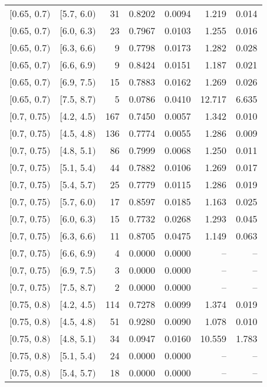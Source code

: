 \begin{longtable}{| l | l | r | r | r | r | r |}
        $[$0.65, 0.7$)$ & $[$5.7, 6.0$)$ & 31  & 0.8202 & 0.0094 & 1.219 & 0.014 \\
        $[$0.65, 0.7$)$ & $[$6.0, 6.3$)$ & 23  & 0.7967 & 0.0103 & 1.255 & 0.016 \\
        $[$0.65, 0.7$)$ & $[$6.3, 6.6$)$ & 9   & 0.7798 & 0.0173 & 1.282 & 0.028 \\
        $[$0.65, 0.7$)$ & $[$6.6, 6.9$)$ & 9   & 0.8424 & 0.0151 & 1.187 & 0.021 \\
        $[$0.65, 0.7$)$ & $[$6.9, 7.5$)$ & 15  & 0.7883 & 0.0162 & 1.269 & 0.026 \\
        $[$0.65, 0.7$)$ & $[$7.5, 8.7$)$ & 5   & 0.0786 & 0.0410 & 12.717 & 6.635 \\
        $[$0.7, 0.75$)$ & $[$4.2, 4.5$)$ & 167 & 0.7450 & 0.0057 & 1.342 & 0.010 \\
        $[$0.7, 0.75$)$ & $[$4.5, 4.8$)$ & 136 & 0.7774 & 0.0055 & 1.286 & 0.009 \\
        $[$0.7, 0.75$)$ & $[$4.8, 5.1$)$ & 86  & 0.7999 & 0.0068 & 1.250 & 0.011 \\
        $[$0.7, 0.75$)$ & $[$5.1, 5.4$)$ & 44  & 0.7882 & 0.0106 & 1.269 & 0.017 \\
        $[$0.7, 0.75$)$ & $[$5.4, 5.7$)$ & 25  & 0.7779 & 0.0115 & 1.286 & 0.019 \\
        $[$0.7, 0.75$)$ & $[$5.7, 6.0$)$ & 17  & 0.8597 & 0.0185 & 1.163 & 0.025 \\
        $[$0.7, 0.75$)$ & $[$6.0, 6.3$)$ & 15  & 0.7732 & 0.0268 & 1.293 & 0.045 \\
        $[$0.7, 0.75$)$ & $[$6.3, 6.6$)$ & 11  & 0.8705 & 0.0475 & 1.149 & 0.063 \\
        $[$0.7, 0.75$)$ & $[$6.6, 6.9$)$ & 4   & 0.0000 & 0.0000 & -- & -- \\
        $[$0.7, 0.75$)$ & $[$6.9, 7.5$)$ & 3   & 0.0000 & 0.0000 & -- & -- \\
        $[$0.7, 0.75$)$ & $[$7.5, 8.7$)$ & 2   & 0.0000 & 0.0000 & -- & -- \\
        $[$0.75, 0.8$)$ & $[$4.2, 4.5$)$ & 114 & 0.7278 & 0.0099 & 1.374 & 0.019 \\
        $[$0.75, 0.8$)$ & $[$4.5, 4.8$)$ & 51  & 0.9280 & 0.0090 & 1.078 & 0.010 \\
        $[$0.75, 0.8$)$ & $[$4.8, 5.1$)$ & 34  & 0.0947 & 0.0160 & 10.559 & 1.783 \\
        $[$0.75, 0.8$)$ & $[$5.1, 5.4$)$ & 24  & 0.0000 & 0.0000 & -- & -- \\
        $[$0.75, 0.8$)$ & $[$5.4, 5.7$)$ & 18  & 0.0000 & 0.0000 & -- & -- \\

\end{longtable}
